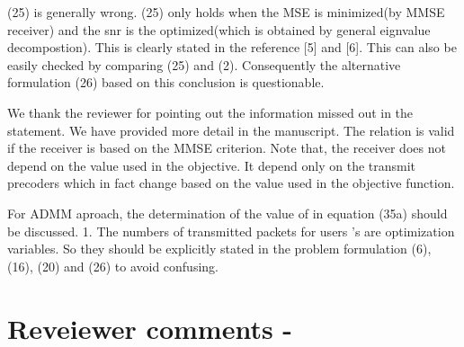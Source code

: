 \begin{itemize}
 (25) is generally wrong. (25) only holds when the MSE is minimized(by MMSE receiver) and the snr is the optimized(which is obtained by general eignvalue decompostion). This is clearly stated in the reference [5] and [6]. This can also be easily checked by comparing (25) and (2). Consequently the alternative formulation (26) based on this conclusion is questionable.

\resp We thank the reviewer for pointing out the information missed out in the statement. We have provided more detail in the manuscript. The relation is valid if the receiver is based on the MMSE criterion. Note that, the receiver does not depend on the  value used in the objective. It depend only on the transmit precoders which in fact change based on the  value used in the objective function. 

 For ADMM aproach, the determination of the value of \me{\rho} in equation (35a) should be discussed. 1. The numbers of transmitted packets for users  's are optimization variables. So they should be explicitly stated in the problem formulation (6), (16), (20) and (26) to avoid confusing.

\end{itemize}

\section*{Reveiewer comments - }

